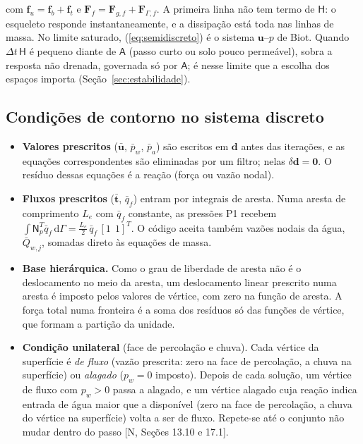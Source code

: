 \documentclass[11pt,a4paper]{article}
\newcommand{\vu}{\bm u}
\newcommand{\vt}{\bm t}
\newcommand{\mt}[1]{\mathsf{#1}}
\newcommand{\dd}{\mathrm d}
\begin{document}
com $\mathbf f_u=\mathbf f_b+\mathbf f_t$ e $\mathbf F_f=\mathbf F_{g,f}+\mathbf F_{\Gamma,f}$.
A primeira linha não tem termo de $\mt H$: o esqueleto responde instantaneamente, e a
dissipação está toda nas linhas de massa. No limite saturado, (\ref{eq:semidiscreto}) é o
sistema $\vu$--$p$ de Biot. Quando $\Delta t\,\mt H$ é pequeno diante de $\mt A$ (passo
curto ou solo pouco permeável), sobra a resposta não drenada, governada só por $\mt A$; é
nesse limite que a escolha dos espaços importa (Seção~\ref{sec:estabilidade}).

\subsection{Condições de contorno no sistema discreto}
\label{sec:contorno}
\begin{itemize}[leftmargin=*]
\item \textbf{Valores prescritos} ($\bar{\vu}$, $\bar p_w$, $\bar p_a$) são escritos em
  $\mathbf d$ antes das iterações, e as equações correspondentes são eliminadas por um
  filtro; nelas $\delta\mathbf d=\mathbf 0$. O resíduo dessas equações é a reação (força ou
  vazão nodal).
\item \textbf{Fluxos prescritos} ($\bar{\vt}$, $\bar q_f$) entram por integrais de aresta.
  Numa aresta de comprimento $L_e$ com $\bar q_f$ constante, as pressões P1 recebem
  $\int\mt N_p^T\bar q_f\,\dd\Gamma=\tfrac{L_e}{2}\,\bar q_f\,[1\ \ 1]^T$. O código aceita
  também vazões nodais da água, $\bar Q_{w,j}$, somadas direto às equações de massa.
\item \textbf{Base hierárquica.} Como o grau de liberdade de aresta não é o deslocamento no
  meio da aresta, um deslocamento linear prescrito numa aresta é imposto pelos valores de
  vértice, com zero na função de aresta. A força total numa fronteira é a soma dos resíduos
  só das funções de vértice, que formam a partição da unidade.
\item \textbf{Condição unilateral} (face de percolação e chuva). Cada vértice da superfície é
  \emph{de fluxo} (vazão prescrita: zero na face de percolação, a chuva na superfície) ou
  \emph{alagado} ($p_w=0$ imposto). Depois de cada solução, um vértice de fluxo com $p_w>0$
  passa a alagado, e um vértice alagado cuja reação indica entrada de água maior que a
  disponível (zero na face de percolação, a chuva do vértice na superfície) volta a ser de
  fluxo. Repete-se até o conjunto não mudar dentro do passo [N, Seções 13.10 e 17.1].
\end{itemize}
\end{document}
